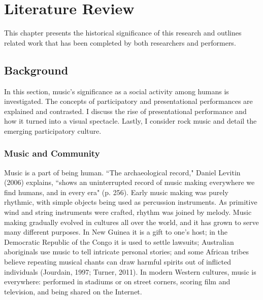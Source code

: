 \chapter{Literature Review}

This chapter presents the historical significance of this research and outlines related work that has been completed by both researchers and performers.

\section{Background}

In this section, music's significance as a social activity among humans is investigated. The concepts of participatory and presentational performances are explained and contrasted. I discuss the rise of presentational performance and how it turned into a visual spectacle. Lastly, I consider rock music and detail the emerging participatory culture.

\subsection{Music and Community}

Music is a part of being human. ``The archaeological record," Daniel Levitin (2006) explains, ``shows an uninterrupted record of music making everywhere we find humans, and in every era" (p. 256). Early music making was purely rhythmic, with simple objects being used as percussion instruments. As primitive wind and string instruments were crafted, rhythm was joined by melody. Music making gradually evolved in cultures all over the world, and it has grown to serve many different purposes. In New Guinea it is a gift to one's host; in the Democratic Republic of the Congo it is used to settle lawsuits; Australian aboriginals use music to tell intricate personal stories; and some African tribes believe repeating musical chants can draw harmful spirits out of inflicted individuals (Jourdain, 1997; Turner, 2011). In modern Western cultures, music is everywhere: performed in stadiums or on street corners, scoring film and television, and being shared on the Internet.

